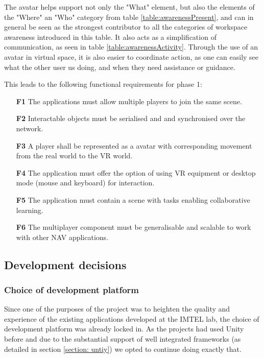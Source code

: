 The avatar helps support not only the "What" element, but also the elements of the "Where" an "Who" category from table \ref{table:awarenessPresent}, and can in general be seen as the strongest contributor to all the categories of workspace awareness introduced in this table. It also acts as a simplification of communication, as seen in table \ref{table:awarenessActivity}. Through the use of an avatar in virtual space, it is also easier to coordinate action, as one can easily see what the other user us doing, and when they need assistance or guidance.


This leads to the following functional requirements for phase 1: 


\begin{enumerate}
  \setlength\itemsep{0em}
  \item [\textbf{F1}] The applications must allow multiple players to join the same scene.
  \item [\textbf{F2}] Interactable objects must be serialised and and synchronised over the network.
  \item [\textbf{F3}] A player shall be represented as a avatar with corresponding movement from the real world to the VR world.
  \item [\textbf{F4}] The application must offer the option of using VR equipment or desktop mode (mouse and keyboard) for interaction.
  \item [\textbf{F5}] The application must contain a scene with tasks enabling collaborative learning.
  \item [\textbf{F6}] The multiplayer component must be generalisable and scalable to work with other NAV applications.
\end{enumerate}

\subsection{Development decisions}
\subsubsection{Choice of development platform}
Since one of the purposes of the project was to heighten the quality and experience of the existing applications developed at the IMTEL lab, the choice of development platform was already locked in. As the projects had used Unity before and due to the substantial support of well integrated frameworks (as detailed in section \ref{section: untiy}) we opted to continue doing exactly that. 

